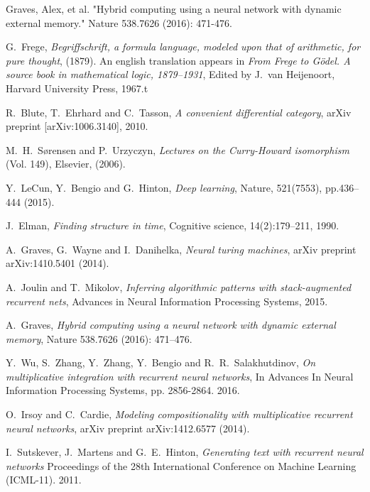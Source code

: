 \documentclass[english,letter paper,12pt,leqno]{article}
\theoremstyle{example}
\numberwithin{equation}{section}
\begin{document}

\providecommand{\bysame}{\leavevmode\hbox to3em{\hrulefill}\thinspace}
\providecommand{\href}[2]{#2}
\begin{thebibliography}{BHLS03}

Graves, Alex, et al. "Hybrid computing using a neural network with dynamic external memory." Nature 538.7626 (2016): 471-476.

G.~Frege, \textsl{Begriffschrift, a formula language, modeled upon that of arithmetic, for pure thought}, (1879). An english translation appears in \textsl{From Frege to G\"odel. A source book in mathematical logic, 1879--1931}, Edited by J.~van Heijenoort, Harvard University Press, 1967.t

R.~Blute, T.~Ehrhard and C.~Tasson, \textsl{A convenient differential category}, arXiv preprint \href{https://arxiv.org/abs/1006.3140}{[arXiv:1006.3140]}, 2010.

M.~H.~S\o rensen and P.~Urzyczyn, \textsl{Lectures on the Curry-Howard isomorphism} (Vol. 149), Elsevier, (2006).

Y.~LeCun, Y.~Bengio and G.~Hinton, \textsl{Deep learning},  Nature, 521(7553), pp.436--444 (2015).

J.~Elman, \textsl{Finding structure in time}, Cognitive science, 14(2):179–211, 1990.

A.~Graves, G.~Wayne and I.~Danihelka, \textsl{Neural turing machines}, arXiv preprint arXiv:1410.5401 (2014).

A.~Joulin and T.~Mikolov, \textsl{Inferring algorithmic patterns with stack-augmented recurrent nets}, Advances in Neural Information Processing Systems, 2015.

A.~Graves, \textsl{Hybrid computing using a neural network with dynamic external memory}, Nature 538.7626 (2016): 471--476.

Y.~Wu, S.~Zhang, Y.~Zhang, Y.~Bengio and R.~R.~Salakhutdinov, \textsl{On multiplicative integration with recurrent neural networks}, In Advances In Neural Information Processing Systems, pp. 2856-2864. 2016.

O.~Irsoy and C.~Cardie, \textsl{Modeling compositionality with multiplicative recurrent neural networks}, arXiv preprint arXiv:1412.6577 (2014).

I.~Sutskever, J.~Martens and G.~E.~Hinton, \textsl{Generating text with recurrent neural networks} Proceedings of the 28th International Conference on Machine Learning (ICML-11). 2011.


\end{thebibliography}
\end{document}

